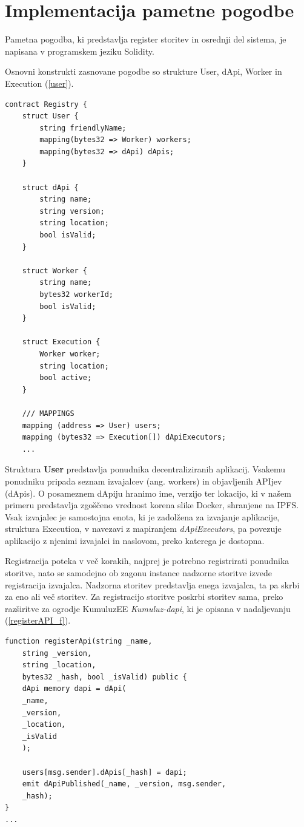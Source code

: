 \documentclass[a4paper, 12pt]{book}
\begin{document}
\section{Implementacija pametne pogodbe}
Pametna pogodba, ki predstavlja register storitev in osrednji del sistema, je napisana v programskem jeziku Solidity.

Osnovni konstrukti zasnovane pogodbe so strukture User, dApi, Worker in Execution (\ref{user}).

\begin{lstlisting}[caption={Osnovni konstrukti pametne pogodbe},captionpos=b,label={user}]
contract Registry {
	struct User {
		string friendlyName;
		mapping(bytes32 => Worker) workers;
		mapping(bytes32 => dApi) dApis;
	}
	
	struct dApi {
		string name;
		string version;
		string location;
		bool isValid;
	}
	
	struct Worker {
		string name;
		bytes32 workerId;
		bool isValid;
	}
	
	struct Execution {
		Worker worker;
		string location;
		bool active;
	}
	
 	/// MAPPINGS
	mapping (address => User) users;
	mapping (bytes32 => Execution[]) dApiExecutors;
	...
\end{lstlisting}

Struktura \textbf{User} predstavlja ponudnika decentraliziranih aplikacij.
Vsakemu ponudniku pripada seznam izvajalcev (ang. workers) in objavljenih APIjev (dApis).
O posameznem dApiju hranimo ime, verzijo ter lokacijo, ki v našem primeru predstavlja zgoščeno vrednost korena slike Docker, shranjene na IPFS.
Vsak izvajalec je samostojna enota, ki je zadolžena za izvajanje aplikacije, struktura Execution, v navezavi z mapiranjem \textit{dApiExecutors}, pa povezuje aplikacijo z njenimi izvajalci in naslovom, preko katerega je dostopna.

Registracija poteka v več korakih, najprej je potrebno registrirati ponudnika storitve, nato se samodejno ob zagonu instance nadzorne storitve izvede registracija izvajalca.
Nadzorna storitev predstavlja enega izvajalca, ta pa skrbi za eno ali več storitev.
Za registracijo storitve poskrbi storitev sama, preko razširitve za ogrodje KumuluzEE \textit{Kumuluz-dapi}, ki je opisana v nadaljevanju (\ref{registerAPI_f}).

\begin{lstlisting}[caption={Funkcija za registracijo APIja},captionpos=b,label={registerAPI_f}]
function registerApi(string _name,
	string _version,
	string _location,
	bytes32 _hash, bool _isValid) public {
	dApi memory dapi = dApi(
	_name,
	_version,
	_location,
	_isValid
	);
	
	users[msg.sender].dApis[_hash] = dapi;
	emit dApiPublished(_name, _version, msg.sender,
	_hash);
}
...
\end{lstlisting}
\end{document}
